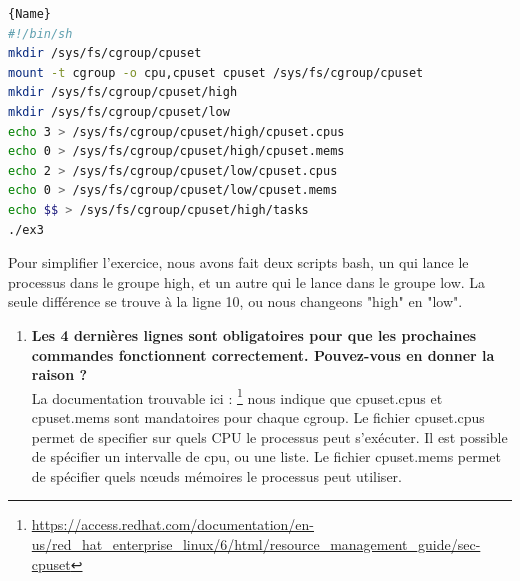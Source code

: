 \documentclass[
	a4paper, %
	10pt, %
]{CSUniSchoolLabReport}
\begin{document}
\begin{lstlisting}[language=bash, firstnumber=1]{Name}
#!/bin/sh
mkdir /sys/fs/cgroup/cpuset
mount -t cgroup -o cpu,cpuset cpuset /sys/fs/cgroup/cpuset
mkdir /sys/fs/cgroup/cpuset/high
mkdir /sys/fs/cgroup/cpuset/low
echo 3 > /sys/fs/cgroup/cpuset/high/cpuset.cpus
echo 0 > /sys/fs/cgroup/cpuset/high/cpuset.mems
echo 2 > /sys/fs/cgroup/cpuset/low/cpuset.cpus
echo 0 > /sys/fs/cgroup/cpuset/low/cpuset.mems
echo $$ > /sys/fs/cgroup/cpuset/high/tasks
./ex3
\end{lstlisting}
Pour simplifier l'exercice, nous avons fait deux scripts bash, un qui lance le processus dans le groupe high, et un autre qui le lance dans le groupe low.
La seule diff\'erence se trouve \`a la ligne 10, ou nous changeons "high" en "low".


\begin{enumerate}[label=\textbf{\arabic*}]
	\item \textbf{Les 4 dernières lignes sont obligatoires pour que les prochaines commandes fonctionnent correctement. Pouvez-vous en donner la raison ?}\\
	La documentation trouvable ici : \footnote{\href{https://access.redhat.com/documentation/en-us/red_hat_enterprise_linux/6/html/resource_management_guide/sec-cpuset}{https://access.redhat.com/documentation/en-us/red\_hat\_enterprise\_linux/6/html/resource\_management\_guide/sec-cpuset}}
	nous indique que cpuset.cpus et cpuset.mems sont mandatoires pour chaque cgroup.
	Le fichier cpuset.cpus permet de specifier sur quels CPU le processus peut s'ex\'ecuter. Il est possible de sp\'ecifier un intervalle de cpu, ou une liste.
	Le fichier cpuset.mems permet de sp\'ecifier quels n\oe{}uds m\'emoires le processus peut utiliser.
	

\end{enumerate}
\end{document}
